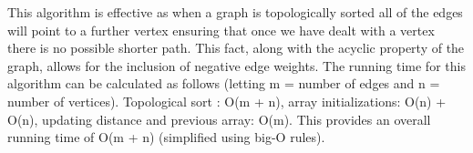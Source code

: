 \documentclass[12pt]{article}
\begin{document}
This algorithm is effective as when a graph is topologically sorted all of the edges will point to a further vertex ensuring that once we have dealt with a vertex there is no possible shorter path. This fact, along with the acyclic property of the graph, allows for the inclusion of negative edge weights. The running time for this algorithm can be calculated as follows (letting m = number of edges and n = number of vertices). Topological sort : O(m + n), array initializations: O(n) + O(n), updating distance and previous array: O(m). This provides an overall running time of O(m + n) (simplified using big-O rules).
\end{document}
